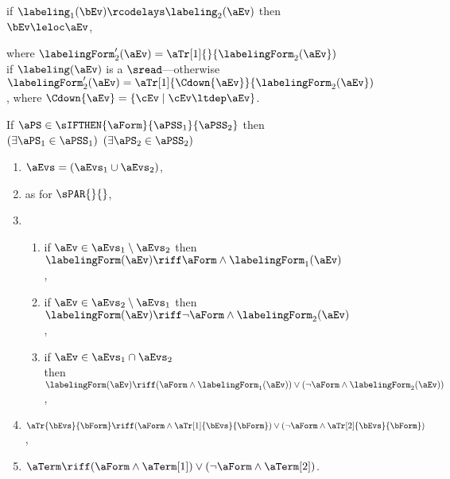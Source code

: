 \begin{figure}
\begin{multicols}{2}
\begin{enumerate}[topsep=0pt,label=(\textsc{s}\arabic*),ref=\textsc{s}\arabic*]
\begin{enumerate}[leftmargin=0pt]
        if $\labeling_1(\bEv)\rcodelays\labeling_2(\aEv)$
        then $\bEv\leloc\aEv$,
      \end{enumerate}
    \end{enumerate}
  \end{multicols}
  where
  $\labelingForm'_2(\aEv)=\aTr[1]{}{\labelingForm_2(\aEv})$ if $\labeling(\aEv)$ is a $\sread$---otherwise
  $\labelingForm'_2(\aEv)=\aTr[1]{\Cdown{\aEv}}{\labelingForm_2(\aEv})$, where
  $\Cdown{\aEv}=\{ \cEv \mid \cEv \ltdep \aEv \}$.
  \medskip

  \noindent
  If $\aPS \in \sIFTHEN{\aForm}{\aPSS_1}{\aPSS_2}$ then
  $(\exists\aPS_1\in\aPSS_1)$ $(\exists\aPS_2\in\aPSS_2)$
  \begin{multicols}{2}
    \begin{enumerate}[topsep=0pt,label=(\textsc{i}\arabic*),ref=\textsc{i}\arabic*]
    \item \label{if-E}
      $\aEvs = (\aEvs_1\cup\aEvs_2)$,
    \item \label{if-lambda}
       as for $\sPAR{}{}$,
    \item[] \setcounter{enumi}{\value{kappa}} 
      \begin{enumerate}[leftmargin=0pt]
      \item \label{if-kappa1}
        if $\aEv\in\aEvs_1\setminus\aEvs_2$ then $\labelingForm(\aEv) \riff \aForm\land\labelingForm_1(\aEv)$,
      \item \label{if-kappa2}
        if $\aEv\in\aEvs_2\setminus\aEvs_1$ then $\labelingForm(\aEv) \riff \neg\aForm\land\labelingForm_2(\aEv)$, 
      \item \label{if-kappa12}
        if $\aEv\in\aEvs_1\cap\aEvs_2$\\ then
        $\labelingForm(\aEv) \riff (\aForm\land\labelingForm_1(\aEv))\lor(\neg\aForm\land\labelingForm_2(\aEv))$,
      \end{enumerate}
    \item \label{if-tau}
      $\aTr{\bEvs}{\bForm} \riff (\aForm\land\aTr[1]{\bEvs}{\bForm})\lor(\neg\aForm\land\aTr[2]{\bEvs}{\bForm})$,
    \item \label{if-term}
      $\aTerm \riff (\aForm\land\aTerm[1])\lor(\neg\aForm\land\aTerm[2])$.
    \end{enumerate}
  \end{multicols}
  \medskip


\end{figure}
